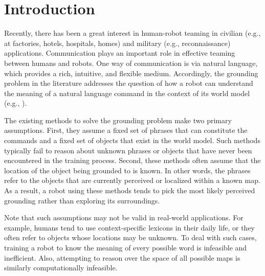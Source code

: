 \section{Introduction}
Recently, there has been a great interest in human-robot teaming in civilian (e.g., at factories, hotels, hospitals, homes) and military (e.g., reconnaissance) applications. Communication plays an important role in effective teaming between humans and robots. One way of communication is via natural language, which provides a rich, intuitive, and flexible medium. Accordingly, the grounding problem in the literature addresses the question of how a robot can understand the meaning of a natural language command in the context of its world model (e.g., \cite{g3,dcg,adcg2016}). 

The existing methods to solve the grounding problem make two primary assumptions. First, they assume a fixed set of phrases that can constitute the commands and a fixed set of objects that exist in the world model. Such methods typically fail to reason about unknown phrases or objects that have never been encountered in the training process.
Second, these methods often assume that the location of the object being grounded to is known. In other words, the phrases refer to the objects that are currently perceived or localized within a known map.
As a result, a robot using these methods tends to pick the most likely perceived grounding rather than exploring its surroundings.

Note that such assumptions may not be valid in real-world applications. For example, humans tend to use context-specific lexicons in their daily life, or they often refer to objects whose locations may be unknown. To deal with such cases, training a robot to know the meaning of every possible word is infeasible and inefficient. Also, attempting to reason over the space of all possible maps is similarly computationally infeasible.

